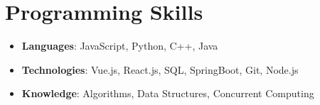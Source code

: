 \documentclass[letterpaper,11pt]{article}
\newcommand{\resumeSubHeadingListStart}{\begin{itemize}[leftmargin=*]}
\newcommand{\resumeSubHeadingListEnd}{\end{itemize}}
\begin{document}
\section{Programming Skills}
 \resumeSubHeadingListStart
   \item{
     \textbf{Languages}{: JavaScript, Python, C++, Java }
   }\vspace{-7pt}
   \item{
     \textbf{Technologies}{: Vue.js, React.js, SQL, SpringBoot, Git, Node.js }
   }
   \vspace{-7pt}
   \item{
     \textbf{Knowledge}{: Algorithms, Data Structures, Concurrent Computing}
   }
 \resumeSubHeadingListEnd


\end{document}
